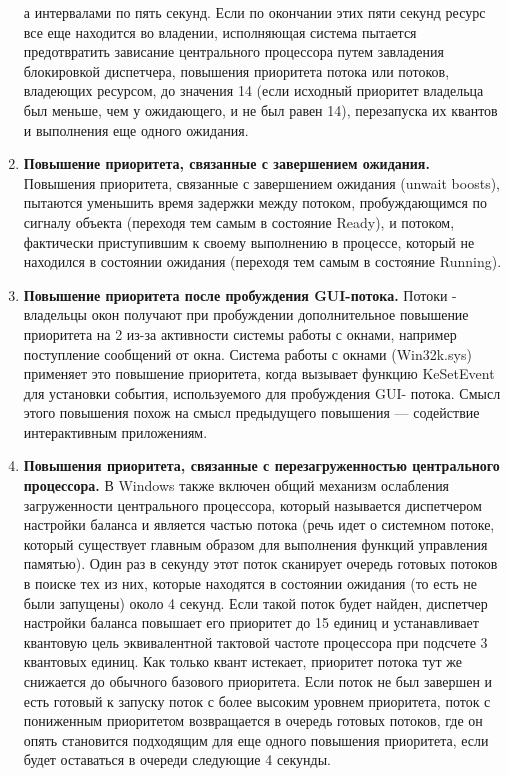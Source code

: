\begin{enumerate}
	а интервалами по пять секунд. Если по окончании этих пяти секунд ресурс все еще
	находится во владении, исполняющая система пытается предотвратить зависание центрального процессора путем завладения блокировкой диспетчера, повышения приоритета потока или потоков, владеющих ресурсом, до значения 14 (если исходный приоритет
	владельца был меньше, чем у ожидающего, и не был равен 14), перезапуска их квантов
	и выполнения еще одного ожидания.
	\item \textbf{Повышение приоритета, связанные с завершением ожидания.} Повышения приоритета, связанные с завершением ожидания (unwait boosts), пытаются уменьшить время задержки между потоком, пробуждающимся по сигналу объекта (переходя тем самым в состояние Ready), и потоком, фактически приступившим к своему выполнению в
	процессе, который не находился в состоянии ожидания (переходя тем самым в состояние
	Running).
	\item \textbf{Повышение приоритета после пробуждения GUI-потока.} Потоки - владельцы окон
	получают при пробуждении дополнительное повышение приоритета на 2 из-за активности системы работы с окнами, например поступление сообщений от окна. Система
	работы с окнами (Win32k.sys) применяет это повышение приоритета, когда вызывает
	функцию KeSetEvent для установки события, используемого для пробуждения GUI-
	потока. Смысл этого повышения похож на смысл предыдущего повышения — содействие
	интерактивным приложениям.
	\item \textbf{Повышения приоритета, связанные с перезагруженностью центрального процессора.} В Windows также включен общий механизм ослабления загруженности центрального процессора, который называется диспетчером настройки баланса и является частью потока (речь идет о системном потоке, который существует главным образом для выполнения функций управления памятью). Один раз в секунду этот поток сканирует очередь готовых потоков в поиске тех из них, которые находятся в состоянии ожидания (то есть не были запущены) около 4 секунд. Если такой поток будет найден, диспетчер настройки баланса повышает его приоритет до 15 единиц и устанавливает квантовую цель эквивалентной тактовой частоте процессора при подсчете 3 квантовых единиц. Как только квант истекает, приоритет потока тут же снижается до обычного базового приоритета. Если поток не был завершен и есть готовый к запуску поток с
	более высоким уровнем приоритета, поток с пониженным приоритетом возвращается в
	очередь готовых потоков, где он опять становится подходящим для еще одного повышения приоритета, если будет оставаться в очереди следующие 4 секунды.

\end{enumerate}
